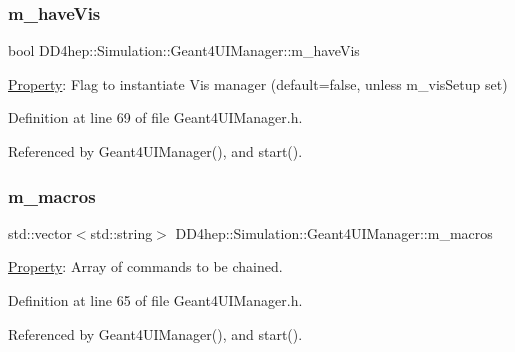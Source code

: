 \subsubsection{\texorpdfstring{m\+\_\+have\+Vis}{m\_haveVis}}
{\footnotesize\ttfamily bool D\+D4hep\+::\+Simulation\+::\+Geant4\+U\+I\+Manager\+::m\+\_\+have\+Vis\hspace{0.3cm}{\ttfamily [protected]}}



\hyperlink{class_d_d4hep_1_1_property}{Property}\+: Flag to instantiate Vis manager (default=false, unless m\+\_\+vis\+Setup set) 



Definition at line 69 of file Geant4\+U\+I\+Manager.\+h.



Referenced by Geant4\+U\+I\+Manager(), and start().

\hypertarget{class_d_d4hep_1_1_simulation_1_1_geant4_u_i_manager_a37b623b5b76a886a17a0ce68ce484188}{}\label{class_d_d4hep_1_1_simulation_1_1_geant4_u_i_manager_a37b623b5b76a886a17a0ce68ce484188} 
\subsubsection{\texorpdfstring{m\+\_\+macros}{m\_macros}}
{\footnotesize\ttfamily std\+::vector$<$std\+::string$>$ D\+D4hep\+::\+Simulation\+::\+Geant4\+U\+I\+Manager\+::m\+\_\+macros\hspace{0.3cm}{\ttfamily [protected]}}



\hyperlink{class_d_d4hep_1_1_property}{Property}\+: Array of commands to be chained. 



Definition at line 65 of file Geant4\+U\+I\+Manager.\+h.



Referenced by Geant4\+U\+I\+Manager(), and start().

\hypertarget{class_d_d4hep_1_1_simulation_1_1_geant4_u_i_manager_a64fbd1b49cb4e68cb8af888c946c1f1d}{}\label{class_d_d4hep_1_1_simulation_1_1_geant4_u_i_manager_a64fbd1b49cb4e68cb8af888c946c1f1d} 
